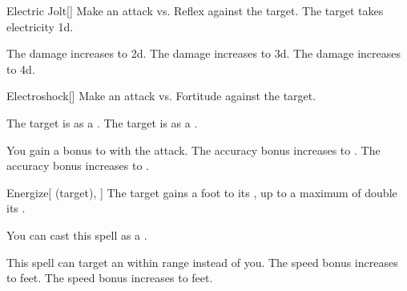 \lowercase{\hypertarget{spell:Electric Jolt}{}}\label{spell:Electric Jolt}
\begin{freeability}[Rank 1]{\hypertarget{spell:Electric Jolt}{Electric Jolt}}[]
Make an attack vs. Reflex against the target.
\hit The target takes electricity  \plus1d.

\rankline
{} The damage increases to  \plus2d.
 The damage increases to  \plus3d.
 The damage increases to  \plus4d.

\end{freeability}
\vspace{0.25em}



\lowercase{\hypertarget{spell:Electroshock}{}}\label{spell:Electroshock}
\begin{freeability}[Rank 1]{\hypertarget{spell:Electroshock}{Electroshock}}[]
Make an attack vs. Fortitude against the target.

\hit The target is  as a .
\crit The target is  as a .

\rankline
{} You gain a  bonus to  with the attack.
 The accuracy bonus increases to .
 The accuracy bonus increases to .

\end{freeability}
\vspace{0.25em}



\lowercase{\hypertarget{spell:Energize}{}}\label{spell:Energize}
\begin{attuneability}[Rank 2]{\hypertarget{spell:Energize}{Energize}}[ (target), ]
The target gains a  foot  to its , up to a maximum of double its .

You can cast this spell as a .

\rankline
{} This spell can target an  within \rngmed range instead of you.
 The speed bonus increases to  feet.
 The speed bonus increases to  feet.

\end{attuneability}
\vspace{0.25em}



